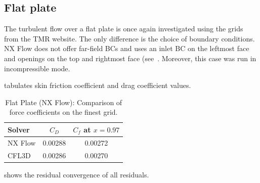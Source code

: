 \subsection{Flat plate}
The turbulent flow over a flat plate is once again investigated using the grids from the TMR website.  The only difference is the choice of boundary conditions. NX Flow does not offer far-field BCs and uses an inlet BC on the leftmost face and openings on the top and rightmost face (see~. Moreover, this case was run in incompressible mode.

 tabulates skin friction coefficient and drag coefficient values.
\begin{table}
\centering
\caption{Flat Plate (NX Flow): Comparison of force coefficients on the finest grid.}
\label{tab:flatnx}
\begin{tabular}{@{}lcc@{}}
    \toprule
    Solver & $C_D$ & $C_f$ at $x=0.97$ \\
    \midrule
    NX Flow & 0.00288 & 0.00272 \\
    CFL3D & 0.00286 & 0.00270\\
    \bottomrule
\end{tabular}
\end{table}
 shows the residual convergence of all residuals.
